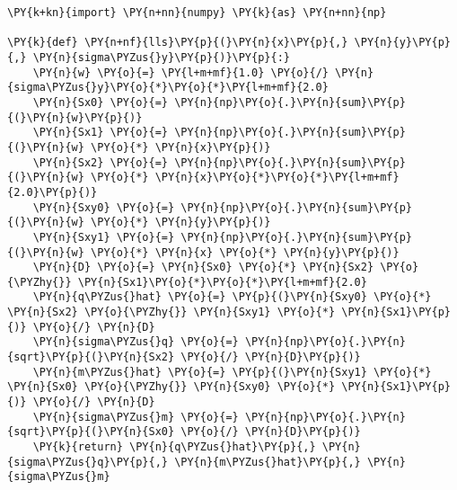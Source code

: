 \begin{Verbatim}[label=\makebox{\href{https://bitbucket.org/lbaldini/statnotes/src/master/snippets/linear\_least\_squares.py}{https://bitbucket.org/.../linear\_least\_squares.py}},commandchars=\\\{\}]
\PY{k+kn}{import} \PY{n+nn}{numpy} \PY{k}{as} \PY{n+nn}{np}

\PY{k}{def} \PY{n+nf}{lls}\PY{p}{(}\PY{n}{x}\PY{p}{,} \PY{n}{y}\PY{p}{,} \PY{n}{sigma\PYZus{}y}\PY{p}{)}\PY{p}{:}
    \PY{n}{w} \PY{o}{=} \PY{l+m+mf}{1.0} \PY{o}{/} \PY{n}{sigma\PYZus{}y}\PY{o}{*}\PY{o}{*}\PY{l+m+mf}{2.0}
    \PY{n}{Sx0} \PY{o}{=} \PY{n}{np}\PY{o}{.}\PY{n}{sum}\PY{p}{(}\PY{n}{w}\PY{p}{)}
    \PY{n}{Sx1} \PY{o}{=} \PY{n}{np}\PY{o}{.}\PY{n}{sum}\PY{p}{(}\PY{n}{w} \PY{o}{*} \PY{n}{x}\PY{p}{)}
    \PY{n}{Sx2} \PY{o}{=} \PY{n}{np}\PY{o}{.}\PY{n}{sum}\PY{p}{(}\PY{n}{w} \PY{o}{*} \PY{n}{x}\PY{o}{*}\PY{o}{*}\PY{l+m+mf}{2.0}\PY{p}{)}
    \PY{n}{Sxy0} \PY{o}{=} \PY{n}{np}\PY{o}{.}\PY{n}{sum}\PY{p}{(}\PY{n}{w} \PY{o}{*} \PY{n}{y}\PY{p}{)}
    \PY{n}{Sxy1} \PY{o}{=} \PY{n}{np}\PY{o}{.}\PY{n}{sum}\PY{p}{(}\PY{n}{w} \PY{o}{*} \PY{n}{x} \PY{o}{*} \PY{n}{y}\PY{p}{)}
    \PY{n}{D} \PY{o}{=} \PY{n}{Sx0} \PY{o}{*} \PY{n}{Sx2} \PY{o}{\PYZhy{}} \PY{n}{Sx1}\PY{o}{*}\PY{o}{*}\PY{l+m+mf}{2.0}
    \PY{n}{q\PYZus{}hat} \PY{o}{=} \PY{p}{(}\PY{n}{Sxy0} \PY{o}{*} \PY{n}{Sx2} \PY{o}{\PYZhy{}} \PY{n}{Sxy1} \PY{o}{*} \PY{n}{Sx1}\PY{p}{)} \PY{o}{/} \PY{n}{D}
    \PY{n}{sigma\PYZus{}q} \PY{o}{=} \PY{n}{np}\PY{o}{.}\PY{n}{sqrt}\PY{p}{(}\PY{n}{Sx2} \PY{o}{/} \PY{n}{D}\PY{p}{)}
    \PY{n}{m\PYZus{}hat} \PY{o}{=} \PY{p}{(}\PY{n}{Sxy1} \PY{o}{*} \PY{n}{Sx0} \PY{o}{\PYZhy{}} \PY{n}{Sxy0} \PY{o}{*} \PY{n}{Sx1}\PY{p}{)} \PY{o}{/} \PY{n}{D}
    \PY{n}{sigma\PYZus{}m} \PY{o}{=} \PY{n}{np}\PY{o}{.}\PY{n}{sqrt}\PY{p}{(}\PY{n}{Sx0} \PY{o}{/} \PY{n}{D}\PY{p}{)}
    \PY{k}{return} \PY{n}{q\PYZus{}hat}\PY{p}{,} \PY{n}{sigma\PYZus{}q}\PY{p}{,} \PY{n}{m\PYZus{}hat}\PY{p}{,} \PY{n}{sigma\PYZus{}m}


\end{Verbatim}
